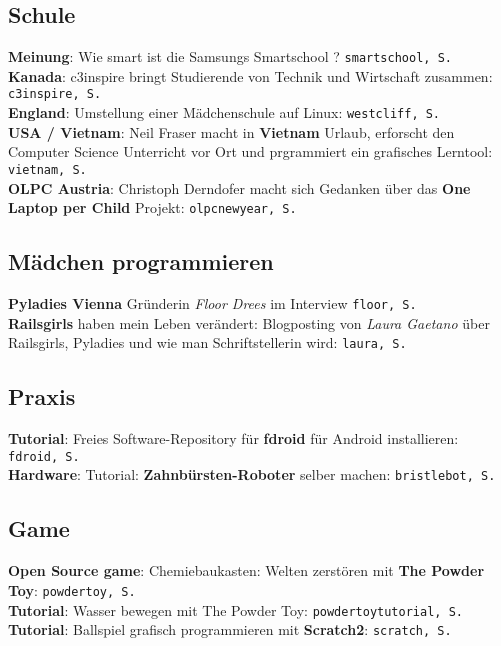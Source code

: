 \subsection*{Schule}

\textbf{Meinung}: Wie smart ist die Samsungs Smartschool ? \texttt{smartschool, S. \pageref{smartschool}}\\
\textbf{Kanada}: c3inspire bringt Studierende von Technik und Wirtschaft zusammen: \texttt{c3inspire, S. \pageref{c3inspire}}\\
\textbf{England}: Umstellung einer Mädchenschule auf Linux: \texttt{westcliff, S. \pageref{westcliff}}\\
\textbf{USA / Vietnam}: Neil Fraser macht in \textbf{Vietnam} Urlaub, erforscht den Computer Science Unterricht vor Ort und prgrammiert ein grafisches Lerntool: \texttt{vietnam, S. \pageref{vietnam}}\\ 
\textbf{OLPC Austria}: Christoph Derndofer macht sich Gedanken über das \textbf{One Laptop per Child} Projekt: \texttt{olpcnewyear, S. \pageref{olpcnewyear}}\\

\subsection*{Mädchen programmieren}

\textbf{Pyladies Vienna} Gründerin \textit{Floor Drees} im Interview \texttt{floor, S. \pageref{floor}}\\
\textbf{Railsgirls} haben mein Leben verändert: Blogposting von \textit{Laura Gaetano} über Railsgirls, Pyladies und wie man Schriftstellerin wird: \texttt{laura, S.\pageref{laura}}\\

\subsection*{Praxis}

\textbf{Tutorial}: Freies Software-Repository für \textbf{fdroid} für Android installieren: \texttt{fdroid, S. \pageref{fdroid}}\\ \textbf{Hardware}: Tutorial: \textbf{Zahnbürsten-Roboter} selber machen: \texttt{bristlebot, S. \pageref{bristlebot}}\\

\subsection*{Game}

\textbf{Open Source game}: Chemiebaukasten: Welten zerstören mit \textbf{The Powder Toy}: \texttt{powdertoy, S. \pageref{powdertoy}}\\
\textbf{Tutorial}: Wasser bewegen mit The Powder Toy: \texttt{powdertoytutorial, S. \pageref{powdertoytutorial}}\\
\textbf{Tutorial}: Ballspiel grafisch programmieren mit \textbf{Scratch2}: \texttt{scratch, S. \pageref{scratch}}\\
